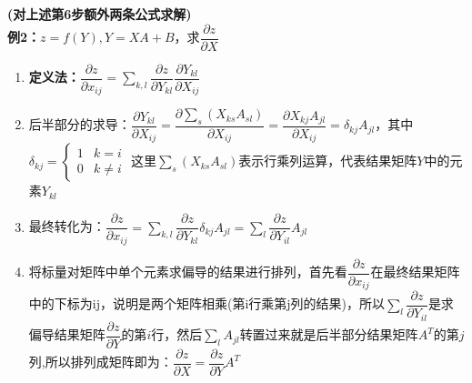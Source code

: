     \textbf{(对上述第6步额外两条公式求解)}
    \\
    \textbf{例2：}$z=f(Y), Y=XA+B$，求$\dfrac{\partial z}{\partial X}$
    \begin{enumerate}
        \item \textbf{定义法：}$\dfrac{\partial z}{\partial x_{i j}}=\sum_{k, l} \dfrac{\partial z}{\partial Y_{k l}} \dfrac{\partial Y_{k l}}{\partial X_{i j}}$
        \item 后半部分的求导：$\dfrac{\partial Y_{k l}}{\partial X_{i j}}=\dfrac{\partial \sum_{s}\left(X_{k s} A_{s l}\right)}{\partial X_{i j}}=\dfrac{\partial X_{k j} A_{j l}}{\partial X_{i j}}=\delta_{k j} A_{j l} $，其中$\delta_{kj}=\left\{\begin{array}{ll}1 & k=i \\ 0 & k \neq i\end{array}\right.$ 这里$\sum_{s}(X_{k s} A_{s l})$表示行乘列运算，代表结果矩阵$Y$中的元素$Y_{kl}$
        \item 最终转化为：$\dfrac{\partial z}{\partial x_{i j}}=\sum_{k, l} \dfrac{\partial z}{\partial Y_{k l}} \delta_{k j} A_{j l} =\sum_{l} \dfrac{\partial z}{\partial Y_{i l}} A_{j l}$
        \item 将标量对矩阵中单个元素求偏导的结果进行排列，首先看$\dfrac{\partial z}{\partial x_{ij}}$在最终结果矩阵中的下标为ij，说明是两个矩阵相乘(第i行乘第j列的结果)，所以$\sum_{l} \dfrac{\partial z}{\partial Y_{i l}}$是求偏导结果矩阵$\dfrac{\partial z}{\partial Y}$的第$i$行，然后$\sum_{l} A_{jl}$转置过来就是后半部分结果矩阵$A^T$的第$j$列,所以排列成矩阵即为：$\dfrac{\partial z}{\partial X}=\dfrac{\partial z}{\partial Y}A^{T} $
    \end{enumerate}


